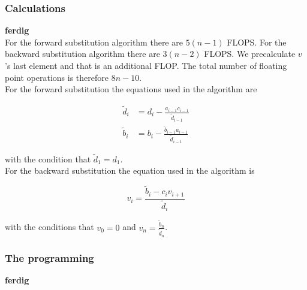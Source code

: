 \documentclass{article}
\begin{document}
  \subsubsection{Calculations}

    {\large \bf ferdig} \\

    For the forward substitution algorithm there are $5(n-1)$ FLOPS. For the backward substitution algorithm there are $3(n-2)$ FLOPS. We precalculate $v$'s last element and that is an additional FLOP. The total number of floating point operations is therefore $8n - 10$. \\

    For the forward substitution the equations used in the algorithm are

    \begin{align}
      \tilde{d}_i &= d_i - \frac{a_{i-1} c_{i-1}}{\tilde{d} _{i-1}} \label{eq:diagonald} \\
      \tilde{b}_i &= b_i - \frac{\tilde{b}_{i-1} a_{i-1}}{\tilde{d}_{i-1}} \label{eq:vectorb}
    \end{align}

    with the condition that $\tilde{d}_1 = d_1$. \\

    For the backward substitution the equation used in the algorithm is

    \begin{equation}
      v_i = \frac{\tilde{b}_i - c_i v_{i+1}}{\tilde{d}_i} \label{eq:solutionv}
    \end{equation}

    with the conditions that $v_0 = 0$ and $v_n = \frac{\tilde{b}_n}{\tilde{d}_n}$.

  \subsubsection{The programming}

    {\bf ferdig} \\
\end{document}
